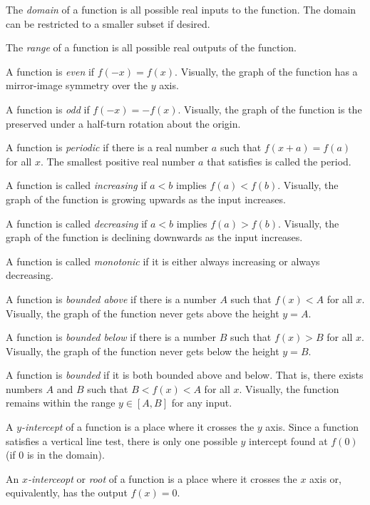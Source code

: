 \documentclass[fleqn]{report}
\begin{document}
\begin{smallitemize}
\item The \emph{domain} of a function is all possible real
inputs to the function. The domain can be
restricted to a smaller subset if desired.
\item The \emph{range} of a function is all possible real
outputs of the function.
\item A function is \emph{even} if $f(-x) = f(x)$. Visually,
the graph of the function has a mirror-image symmetry over the
$y$ axis.
\item A function is \emph{odd} if $f(-x) = -f(x)$. Visually,
the graph of the function is the preserved under a half-turn
rotation about the origin.
\item A function is \emph{periodic} if there is a real number
$a$ such that $f(x+a) = f(a)$ for all $x$. The smallest positive
real number $a$ that satisfies is called the period.
\item A function is called \emph{increasing} if $a<b$ implies $f(a) <
f(b)$. Visually, the graph of the function is growing upwards
as the input increases. 
\item A function is called \emph{decreasing} if $a<b$ implies
$f(a) > f(b)$. Visually, the graph of the function is
declining downwards as the input increases.
\item A function is called \emph{monotonic} if it is either
always increasing or always decreasing. 
\item A function is \emph{bounded above} if there is a number $A$
such that $f(x) < A$ for all $x$. Visually, the graph of the
function never gets above the height $y=A$.
\item A function is \emph{bounded below} if there is a number $B$
such that $f(x) > B$ for all $x$. Visually, the graph of the
function never gets below the height $y=B$.
\item A function is \emph{bounded} if it is both bounded above and
below. That is, there exists numbers $A$ and $B$ such that $B
< f(x) < A$ for all $x$. Visually, the function remains
within the range $y \in [A,B]$ for any input.
\item A \emph{$y$-intercept} of a function is a place where it
crosses the $y$ axis. Since a function satisfies a vertical
line test, there is only one possible $y$ intercept found at
$f(0)$ (if $0$ is in the domain).
\item An \emph{$x$-interceopt} or \emph{root} of a function is
a place where it crosses the $x$ axis or, equivalently, has
the output $f(x) = 0$. 
\end{smallitemize}
\end{document}
